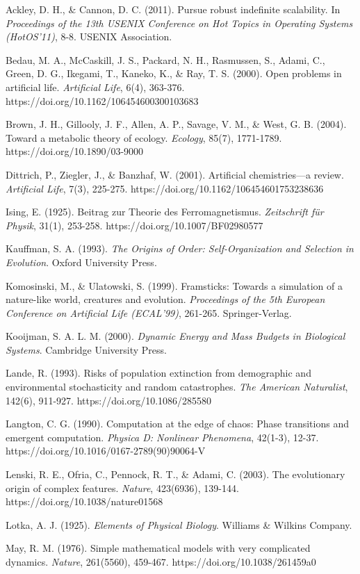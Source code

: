 \documentclass[
]{article}
\begin{document}
Ackley, D. H., \& Cannon, D. C. (2011). Pursue robust indefinite
scalability. In \emph{Proceedings of the 13th USENIX Conference on Hot
Topics in Operating Systems (HotOS'11)}, 8-8. USENIX Association.

Bedau, M. A., McCaskill, J. S., Packard, N. H., Rasmussen, S., Adami,
C., Green, D. G., Ikegami, T., Kaneko, K., \& Ray, T. S. (2000). Open
problems in artificial life. \emph{Artificial Life}, 6(4), 363-376.
https://doi.org/10.1162/106454600300103683

Brown, J. H., Gillooly, J. F., Allen, A. P., Savage, V. M., \& West, G.
B. (2004). Toward a metabolic theory of ecology. \emph{Ecology}, 85(7),
1771-1789. https://doi.org/10.1890/03-9000

Dittrich, P., Ziegler, J., \& Banzhaf, W. (2001). Artificial
chemistries---a review. \emph{Artificial Life}, 7(3), 225-275.
https://doi.org/10.1162/106454601753238636

Ising, E. (1925). Beitrag zur Theorie des Ferromagnetismus.
\emph{Zeitschrift für Physik}, 31(1), 253-258.
https://doi.org/10.1007/BF02980577

Kauffman, S. A. (1993). \emph{The Origins of Order: Self-Organization
and Selection in Evolution}. Oxford University Press.

Komosinski, M., \& Ulatowski, S. (1999). Framsticks: Towards a
simulation of a nature-like world, creatures and evolution.
\emph{Proceedings of the 5th European Conference on Artificial Life
(ECAL'99)}, 261-265. Springer-Verlag.

Kooijman, S. A. L. M. (2000). \emph{Dynamic Energy and Mass Budgets in
Biological Systems}. Cambridge University Press.

Lande, R. (1993). Risks of population extinction from demographic and
environmental stochasticity and random catastrophes. \emph{The American
Naturalist}, 142(6), 911-927. https://doi.org/10.1086/285580

Langton, C. G. (1990). Computation at the edge of chaos: Phase
transitions and emergent computation. \emph{Physica D: Nonlinear
Phenomena}, 42(1-3), 12-37. https://doi.org/10.1016/0167-2789(90)90064-V

Lenski, R. E., Ofria, C., Pennock, R. T., \& Adami, C. (2003). The
evolutionary origin of complex features. \emph{Nature}, 423(6936),
139-144. https://doi.org/10.1038/nature01568

Lotka, A. J. (1925). \emph{Elements of Physical Biology}. Williams \&
Wilkins Company.

May, R. M. (1976). Simple mathematical models with very complicated
dynamics. \emph{Nature}, 261(5560), 459-467.
https://doi.org/10.1038/261459a0
\end{document}
